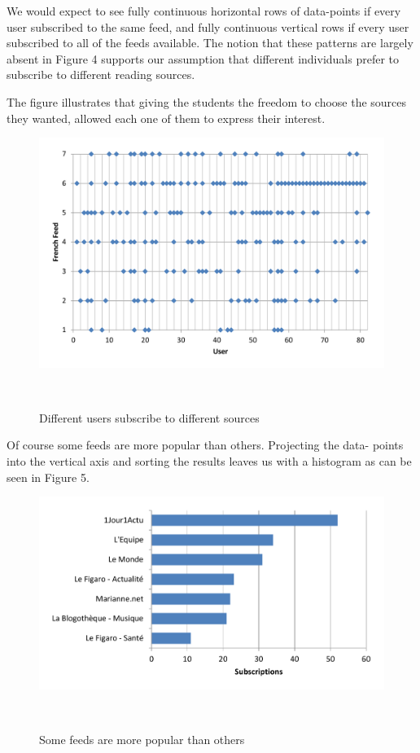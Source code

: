 We would expect to see fully continuous horizontal rows of data-points if every user subscribed to the same feed, and fully continuous vertical rows if every user subscribed to all of the feeds available. The notion that these patterns are largely absent in Figure 4 supports our assumption that different individuals prefer to subscribe to different reading sources.

The figure illustrates that giving the students the freedom to choose the sources they wanted, allowed each one of them to express their interest. 

\begin{figure}[h!]
\centering
  \includegraphics[width=\columnwidth]{figures/users_feeds}
  \caption{Different users subscribe to different sources}~\label{fig:registrations}
\end{figure}

Of course some feeds are more popular than others. Projecting the data- points into the vertical axis and sorting the results leaves us with a histogram as can be seen in Figure 5.

\begin{figure}[h!]
\centering
  \includegraphics[width=\columnwidth]{figures/feed_popularity}
  \caption{Some feeds are more popular than others}~\label{fig:registrations}
\end{figure}


